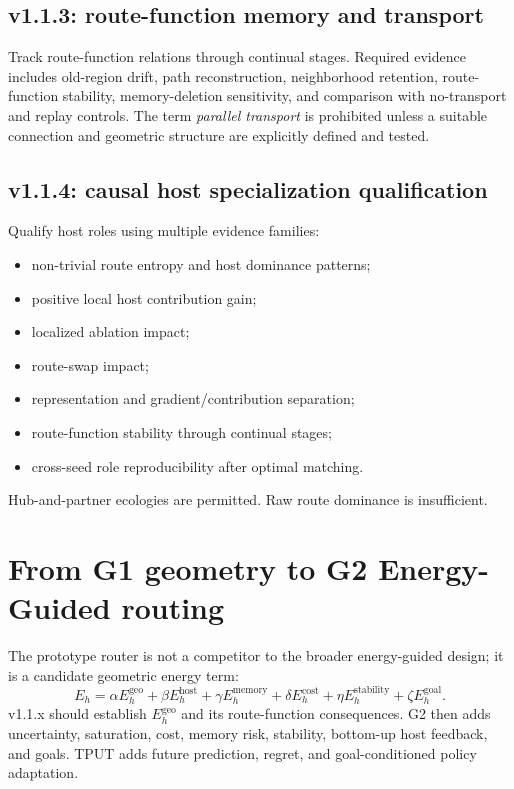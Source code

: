 \documentclass[11pt,a4paper]{article}
\begin{document}
\subsection{v1.1.3: route-function memory and transport}
Track route-function relations through continual stages. Required evidence includes old-region drift, path reconstruction, neighborhood retention, route-function stability, memory-deletion sensitivity, and comparison with no-transport and replay controls. The term \emph{parallel transport} is prohibited unless a suitable connection and geometric structure are explicitly defined and tested.

\subsection{v1.1.4: causal host specialization qualification}
Qualify host roles using multiple evidence families:
\begin{itemize}
\item non-trivial route entropy and host dominance patterns;
\item positive local host contribution gain;
\item localized ablation impact;
\item route-swap impact;
\item representation and gradient/contribution separation;
\item route-function stability through continual stages;
\item cross-seed role reproducibility after optimal matching.
\end{itemize}
Hub-and-partner ecologies are permitted. Raw route dominance is insufficient.

\section{From G1 geometry to G2 Energy-Guided routing}
The prototype router is not a competitor to the broader energy-guided design; it is a candidate geometric energy term:
\begin{equation}
E_h=\alpha E_h^{\mathrm{geo}}+\beta E_h^{\mathrm{host}}+
\gamma E_h^{\mathrm{memory}}+\delta E_h^{\mathrm{cost}}+
\eta E_h^{\mathrm{stability}}+\zeta E_h^{\mathrm{goal}}.
\end{equation}
v1.1.x should establish $E_h^{\mathrm{geo}}$ and its route-function consequences. G2 then adds uncertainty, saturation, cost, memory risk, stability, bottom-up host feedback, and goals. TPUT adds future prediction, regret, and goal-conditioned policy adaptation.
\end{document}
